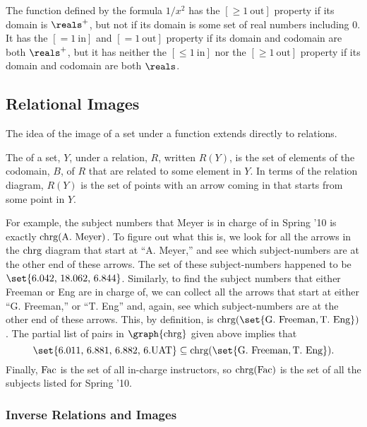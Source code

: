 \begin{example}
  The function defined by the formula $1/x^2$ has the $[\ge 1\
  \text{out}]$ property if its domain is $\reals^+$, but not if its domain
  is some set of real numbers including 0.  It has the $[=1\ \text{in}]$
  and $[=1\ \text{out}]$ property if its domain and codomain are both
  $\reals^+$, but it has neither the $[\le 1\ \text{in}]$ nor the $[\ge 1\
  \text{out}]$ property if its domain and codomain are both $\reals$.
\end{example}

\subsection{Relational Images}
The idea of the image of a set under a function extends directly to
relations.

\begin{definition}
  The  of a set, $Y$, under a relation, $R$, written $R(Y)$,
  is the set of elements of the codomain, $B$, of $R$ that are related to
  some element in $Y$.  In terms of the relation diagram, $R(Y)$ is the
  set of points with an arrow coming in that starts from some point in $Y$.
\iffalse
, namely,
\[
R(Y) \eqdef \set{b \in B \suchthat yRb \text{ for some } y \in Y}.
\]\fi
\end{definition}

For example, the subject numbers that Meyer is in charge of in Spring
'10 is exactly $\text{chrg}(\text{A. Meyer})$.  To figure out what this
is, we look for all the arrows in the $\text{chrg}$ diagram that start at
``A. Meyer,'' and see which subject-numbers are at the other end of
these arrows.  The set of these subject-numbers happened to be
$\set{\text{6.042, 18.062, 6.844}}$.  Similarly, to find the subject
numbers that either Freeman or Eng are in charge of, we can collect
all the arrows that start at either ``G. Freeman,'' or ``T. Eng'' and,
again, see which subject-numbers are at the other end of these arrows.
This, by definition, is $\inchrg(\set{\text{G. Freeman},
  \text{T. Eng}})$.  The partial list of pairs in $\graph{\inchrg}$
given above implies that
\[
\set{\text{6.011, 6.881, 6.882, 6.UAT}} \subseteq
\inchrg(\set{\text{G. Freeman}, \text{T. Eng}}).
\]
Finally, $\text{Fac}$ is the set of all in-charge instructors, so
$\text{chrg}(\text{Fac})$ is the set of all the subjects listed for Spring '10.

\subsubsection{Inverse Relations and Images}

